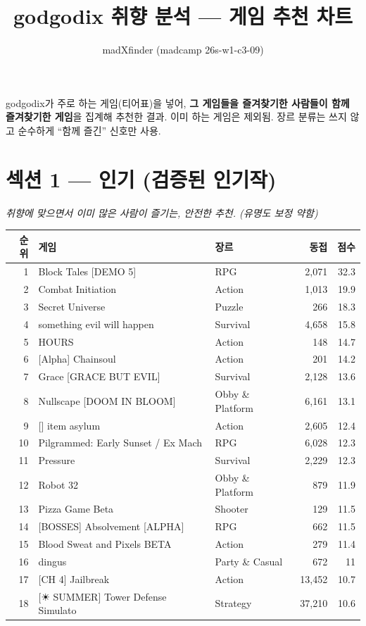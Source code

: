 \documentclass[10pt]{article}
\title{\textbf{godgodix 취향 분석 — 게임 추천 차트}}
\author{madXfinder (madcamp 26s-w1-c3-09)}
\date{}
\begin{document}
\maketitle

\noindent godgodix가 주로 하는 게임(티어표)을 넣어, \textbf{그 게임들을 즐겨찾기한 사람들이
함께 즐겨찾기한 게임}을 집계해 추천한 결과. 이미 하는 게임은 제외됨.
장르 분류는 쓰지 않고 순수하게 ``함께 즐긴'' 신호만 사용.

\vspace{4mm}
\section*{섹션 1 — 인기 (검증된 인기작)}
\textit{취향에 맞으면서 이미 많은 사람이 즐기는, 안전한 추천. (유명도 보정 약함)}

\begin{longtable}{r l l r r}
\toprule
순위 & 게임 & 장르 & 동접 & 점수 \\
\midrule
\endhead
1 & Block Tales [DEMO 5] & RPG & 2,071 & 32.3 \\
2 & Combat Initiation & Action & 1,013 & 19.9 \\
3 & Secret Universe & Puzzle & 266 & 18.3 \\
4 & something evil will happen & Survival & 4,658 & 15.8 \\
5 & HOURS & Action & 148 & 14.7 \\
6 & [Alpha] Chainsoul & Action & 201 & 14.2 \\
7 & Grace [GRACE BUT EVIL] & Survival & 2,128 & 13.6 \\
8 & Nullscape [DOOM IN BLOOM] & Obby \& Platform & 6,161 & 13.1 \\
9 & [] item asylum & Action & 2,605 & 12.4 \\
10 & Pilgrammed: Early Sunset / Ex Mach & RPG & 6,028 & 12.3 \\
11 & Pressure & Survival & 2,229 & 12.3 \\
12 & Robot 32 & Obby \& Platform & 879 & 11.9 \\
13 & Pizza Game Beta & Shooter & 129 & 11.5 \\
14 & [BOSSES] Absolvement [ALPHA] & RPG & 662 & 11.5 \\
15 & Blood Sweat and Pixels BETA & Action & 279 & 11.4 \\
16 & dingus & Party \& Casual & 672 & 11 \\
17 & [CH 4] Jailbreak & Action & 13,452 & 10.7 \\
18 & [☀ SUMMER]  Tower Defense Simulato & Strategy & 37,210 & 10.6 \\

\end{longtable}
\end{document}
